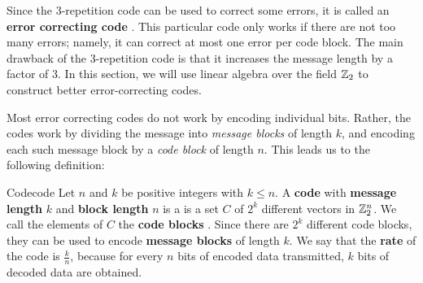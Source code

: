 Since the 3-repetition code can be used to correct some errors, it is
called an \textbf{error correcting code}%
%
. This
particular code only works if there are not too many errors; namely,
it can correct at most one error per code block. The main drawback of
the 3-repetition code is that it increases the message length by a
factor of 3. In this section, we will use linear algebra over the
field $\mathbb{Z}_2$ to construct better error-correcting codes.

Most error correcting codes do not work by encoding individual
bits. Rather, the codes work by dividing the message into
\textit{message blocks} of length $k$, and encoding each such message
block by a \textit{code block} of length $n$.  This leads us to the
following definition:

\begin{definition}{Code}{code}
  Let $n$ and $k$ be positive integers with $k\leq n$. A
  \textbf{code}%
   with \textbf{message length}%
   $k$ and \textbf{block
    length}%
   $n$ is a is a set $C$ of
  $2^k$ different vectors in $\mathbb{Z}_2^n$. We call the elements of $C$ the
  \textbf{code blocks}%
  . Since there are $2^k$ different code
  blocks, they can be used to encode \textbf{message blocks}%
   of length $k$. We say that the
  \textbf{rate}%
   of the code is $\frac{k}{n}$,
  because for every $n$ bits of encoded data transmitted, $k$
  bits of decoded data are obtained.
\end{definition}

